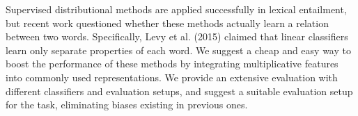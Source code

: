 Supervised distributional methods are applied successfully in lexical entailment, but recent work questioned whether these methods actually learn a relation between two words. Specifically, Levy et al. (2015) claimed that linear classifiers learn only separate properties of each word. We suggest a cheap and easy way to boost the performance of these methods by integrating multiplicative features into commonly used representations. We provide an extensive evaluation with different classifiers and evaluation setups, and suggest a suitable evaluation setup for the task, eliminating biases existing in previous ones.
